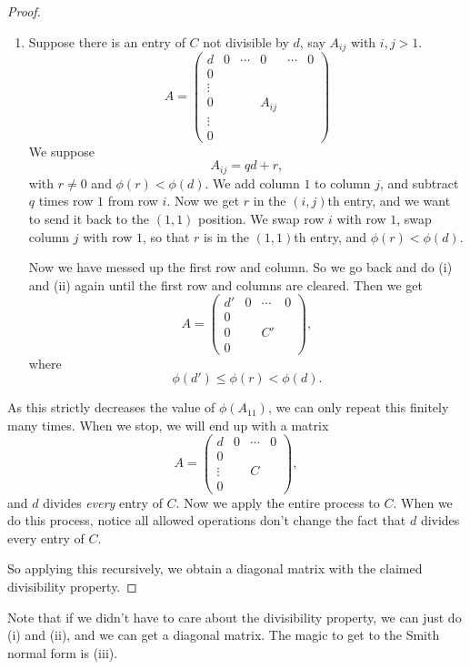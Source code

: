 \documentclass[a4paper]{article}
\begin{document}
\begin{proof}
  \begin{enumerate}[resume]
    \item Suppose there is an entry of $C$ not divisible by $d$, say $A_{ij}$ with $i, j > 1$.
      \[
        A =
        \begin{pmatrix}
          d & 0 & \cdots & 0 & \cdots & 0\\
          0\\
          \vdots\\
          0 & & & A_{ij}\\
          \vdots &\\
          0
        \end{pmatrix}
      \]
      We suppose
      \[
        A_{ij} = qd + r,
      \]
      with $r \not= 0$ and $\phi(r) < \phi(d)$. We add column $1$ to column $j$, and subtract $q$ times row $1$ from row $i$. Now we get $r$ in the $(i, j)$th entry, and we want to send it back to the $(1, 1)$ position. We swap row $i$ with row $1$, swap column $j$ with row $1$, so that $r$ is in the $(1, 1)$th entry, and $\phi(r) < \phi(d)$.

      Now we have messed up the first row and column. So we go back and do (i) and (ii) again until the first row and columns are cleared. Then we get
      \[
        A = \begin{pmatrix}
          d' & 0 & \cdots & 0\\
          0 \\
          0 & & C'\\
          0
        \end{pmatrix},
      \]
      where
      \[
        \phi(d') \leq \phi(r) < \phi(d).
      \]
  \end{enumerate}
  As this strictly decreases the value of $\phi(A_{11})$, we can only repeat this finitely many times. When we stop, we will end up with a matrix
  \[
    A = \begin{pmatrix}
      d & 0 & \cdots & 0\\
      0 \\
      \vdots & & C\\
      0
    \end{pmatrix},
  \]
  and $d$ divides \emph{every} entry of $C$. Now we apply the entire process to $C$. When we do this process, notice all allowed operations don't change the fact that $d$ divides every entry of $C$.

  So applying this recursively, we obtain a diagonal matrix with the claimed divisibility property.
\end{proof}
Note that if we didn't have to care about the divisibility property, we can just do (i) and (ii), and we can get a diagonal matrix. The magic to get to the Smith normal form is (iii).
\end{document}
